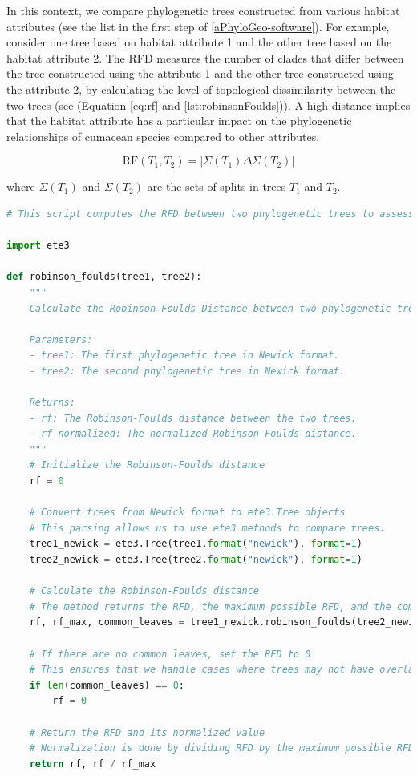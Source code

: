 In this context, we compare phylogenetic trees constructed from various habitat attributes (see the list in the first step of \autoref{aPhyloGeo-software}). For example, consider one tree based on habitat attribute 1 and the other tree based on the habitat attribute 2. The RFD measures the number of clades that differ between the tree constructed using the attribute 1 and the other tree constructed using the attribute 2, by calculating the level of topological dissimilarity between the two trees (see (Equation \eqref{eq:rf} and \autoref{lst:robinsonFoulds})). A high distance implies that the habitat attribute has a particular impact on the phylogenetic relationships of cumacean species compared to other attributes.

\begin{equation}\label{eq:rf}
    \text{RF}(T_1, T_2) = | \Sigma(T_1) \Delta \Sigma(T_2) |
\end{equation}

where $\Sigma(T_1)$ and $\Sigma(T_2)$ are the sets of splits in trees $T_1$ and $T_2$.

\begin{lstlisting}[label=lst:robinsonFoulds,language=Python,caption=Python script for calculating the Robinson-Foulds Distance using the ete3 package in the aPhyloGeo package.]
# This script computes the RFD between two phylogenetic trees to assess their topological dissimilarity.

import ete3

def robinson_foulds(tree1, tree2):
    """
    Calculate the Robinson-Foulds Distance between two phylogenetic trees.

    Parameters:
    - tree1: The first phylogenetic tree in Newick format.
    - tree2: The second phylogenetic tree in Newick format.

    Returns:
    - rf: The Robinson-Foulds distance between the two trees.
    - rf_normalized: The normalized Robinson-Foulds distance.
    """
    # Initialize the Robinson-Foulds distance
    rf = 0

    # Convert trees from Newick format to ete3.Tree objects
    # This parsing allows us to use ete3 methods to compare trees.
    tree1_newick = ete3.Tree(tree1.format("newick"), format=1)
    tree2_newick = ete3.Tree(tree2.format("newick"), format=1)

    # Calculate the Robinson-Foulds distance
    # The method returns the RFD, the maximum possible RFD, and the common leaves (i.e., taxa) between the trees.
    rf, rf_max, common_leaves = tree1_newick.robinson_foulds(tree2_newick, unrooted_trees=True)

    # If there are no common leaves, set the RFD to 0
    # This ensures that we handle cases where trees may not have overlapping taxa.
    if len(common_leaves) == 0:
        rf = 0

    # Return the RFD and its normalized value
    # Normalization is done by dividing RFD by the maximum possible RFD.
    return rf, rf / rf_max
\end{lstlisting}

